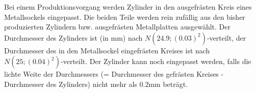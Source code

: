 \documentclass{abgabe}
\begin{document}
\begin{questions}
    \question
    Bei einem Produktionsvorgang werden Zylinder in den ausgefrästen Kreis eines Metallsockels eingepasst. 
    Die beiden Teile werden rein zufällig aus den bisher produzierten Zylindern bzw. ausgefrästen Metallplatten ausgewählt. 
    Der Durchmesser des Zylinders ist (in \si{\mm}) nach $N(24.9; (0.03)^2)$-verteilt, der Durchmesser des in den Metallsockel eingefrästen Kreises ist nach $N(25; (0.04)^2)$-verteilt. 
    Der Zylinder kann noch eingepasst werden, falls die lichte Weite der Durchmessers (= Durchmesser des gefrästen Kreises - Durchmesser des Zylinders) nicht mehr als $0.2\si{\mm}$ beträgt.
\end{questions}
\end{document}

